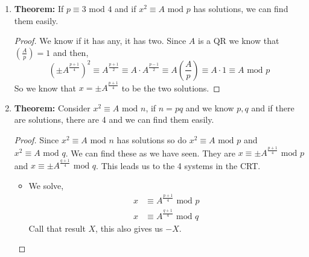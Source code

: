 \documentclass[class=article, crop=false]{standalone}
\def\leg#1#2{\left(\frac{#1}{#2}\right)}
\begin{document}
\begin{enumerate}
\begin{proof}
\begin{itemize}
		\item Now, consider this system,
		\begin{align*}
			x&\equiv a\mbox{ mod }p \\
			x&\equiv -a\mbox{ mod }q
		\end{align*}
		by the CRT this has a unique solution mod $pq=n$. Call this solution $Y$. \\\\
		likewise, $x=-Y$ is a solution as well. Since it satisfies
		\begin{align*}
			x&\equiv -a\mbox{ mod }p \\
			x&\equiv a\mbox{ mod }q
		\end{align*}
	\end{itemize}
	So, all together we have $x=X,-X, Y, -Y$ as our solution where they are all distinct
	mod $n=pq$.
	\end{proof}

	\item \textbf{Theorem:} If $p\equiv 3\mbox{ mod }4$ and if $x^2\equiv A\mbox{ mod }p$ has
	solutions, we can find them easily.
	\begin{proof}
		We know if it has any, it has two. Since $A$ is a QR we know that $\leg{A}{p}=1$
		and then,
		$$\left(\pm A^{\frac{p+1}{4}}\right)^2\equiv A^{\frac{p+1}{2}}\equiv A\cdot A^{\frac{p-1}{2}}
		\equiv A\leg{A}{p}\equiv A\cdot 1\equiv A\mbox{ mod }p$$
		So we know that $x=\pm A^{\frac{p+1}{4}}$ to be the two solutions.
	\end{proof}

	\item \textbf{Theorem:} Consider $x^2\equiv A\mbox{ mod }n$, if $n=pq$ and we know $p,q$
	and if there are solutions, there are 4 and we can find them easily.
	\begin{proof}
		Since $x^2\equiv A \mbox{ mod }n$ has solutions so do $x^2\equiv A\mbox{ mod }p$ and
		$x^2\equiv A\mbox{ mod }q$. We can find these as we have seen.
		They are $x\equiv\pm A^{\frac{p+1}{4}}\mbox{ mod }p$
		and $x\equiv\pm A^{\frac{q+1}{4}}\mbox{ mod }q$.
		This leads us to the 4 systems in the CRT.
		\begin{itemize}
			\item We solve,
			\begin{align*}
				x&\equiv A^{\frac{p+1}{4}}\mbox{ mod }p \\
				x&\equiv A^{\frac{q+1}{4}}\mbox{ mod }q
			\end{align*}
			Call that result $X$, this also gives us $-X$.


\end{itemize}
\end{proof}
\end{enumerate}
\end{document}
